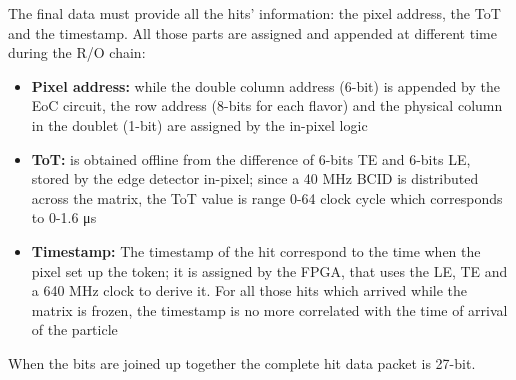     The final data must provide all the hits' information: the pixel address, the ToT and the timestamp. All those parts are assigned and appended at different time during the R/O chain:  
    \begin{itemize}
        \item\textbf{Pixel address:} while the double column address (6-bit) is appended by the EoC circuit, the row address (8-bits for each flavor) and the physical column in the doublet (1-bit) are assigned by the in-pixel logic      
        \item \textbf{ToT:} is obtained offline from the difference of 6-bits TE and 6-bits LE, stored by the edge detector in-pixel; since a 40 MHz BCID is distributed across the matrix, the ToT value is range 0-64 clock cycle which corresponds to 0-1.6 \si{\us}  
        \item \textbf{Timestamp:} The timestamp of the hit correspond to the time when the pixel set up the token; it is assigned by the FPGA, that uses the LE, TE and a 640 MHz clock to derive it. For all those hits which arrived while the matrix is frozen, the timestamp is no more correlated with the time of arrival of the particle         
    \end{itemize}
    When the bits are joined up together the complete hit data packet is 27-bit. 


 
    
    
    
    

